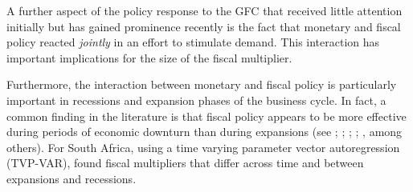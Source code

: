 \documentclass[a4paper,11pt]{article}
\numberwithin{equation}{section}
\begin{document}
	
	A further aspect of the policy response to the GFC that received little attention initially but has gained prominence recently is the fact that monetary and fiscal policy reacted \textit{jointly} in an effort to stimulate demand. This interaction has important implications for the size of the fiscal multiplier. 
	
	Furthermore, the interaction between monetary and fiscal policy is particularly important in recessions and expansion phases of the business cycle. In fact, a common finding in the literature is that fiscal policy appears to be more effective during periods of economic downturn than during expansions (see \citealp{auerbach}; \citealp{baum2012}; \citealp{owyang2013}; \citealp{auerbach2014}; \citealp{canzoneri2015}, among others). For South Africa, using a time varying parameter vector autoregression (TVP-VAR), \cite{jooste} found fiscal multipliers that differ across time and between expansions and recessions. 
	
	{}
	
\end{document}
